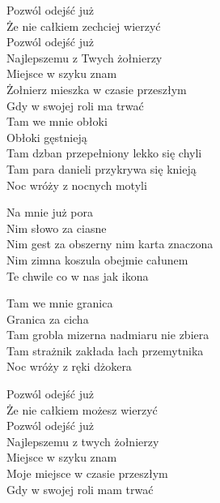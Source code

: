 
\begin{text}
    Pozwól odejść już\\
    Że nie całkiem zechciej wierzyć\\
    Pozwól odejść już\\
    Najlepszemu z Twych żołnierzy\\
    Miejsce w szyku znam\\
    Żołnierz mieszka w czasie przeszłym\\
    Gdy w swojej roli ma trwać\\
    Tam we mnie obłoki\\
    Obłoki gęstnieją\\
    Tam dzban przepełniony lekko się chyli\\
    Tam para danieli przykrywa się knieją\\
    Noc wróży z nocnych motyli

    \vin Na mnie już pora\\
    \vin Nim słowo za ciasne\\
    \vin Nim gest za obszerny nim karta znaczona\\
    \vin Nim zimna koszula obejmie całunem\\
    \vin Te chwile co w nas jak ikona

    Tam we mnie granica\\
    Granica za cicha\\
    Tam grobla mizerna nadmiaru nie zbiera\\
    Tam strażnik zakłada łach przemytnika\\
    Noc wróży z ręki dżokera

    Pozwól odejść już\\
    Że nie całkiem możesz wierzyć\\
    Pozwól odejść już\\
    Najlepszemu z twych żołnierzy\\
    Miejsce w szyku znam\\
    Moje miejsce w czasie przeszłym\\
    Gdy w swojej roli mam trwać

\end{text}

